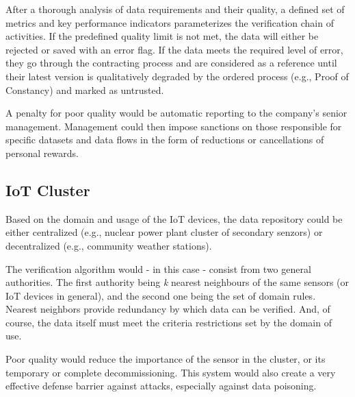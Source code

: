 After a thorough analysis of data requirements and their quality, a defined set of metrics and key performance indicators parameterizes the verification chain of activities.
If the predefined quality limit is not met, the data will either be rejected or saved with an error flag.
If the data meets the required level of error, they go through the contracting process and are considered as a reference until their latest version is qualitatively degraded by the ordered process (e.g., Proof of Constancy) and marked as untrusted.

A penalty for poor quality would be automatic reporting to the company's senior management.
Management could then impose sanctions on those responsible for specific datasets and data flows in the form of reductions or cancellations of personal rewards.

\subsection{IoT Cluster}

Based on the domain and usage of the IoT devices, the data repository could be either centralized (e.g., nuclear power plant cluster of secondary senzors) or decentralized (e.g., community weather stations).

The verification algorithm would - in this case - consist from two general authorities.
The first authority being \textit{k} nearest neighbours of the same sensors (or IoT devices in general), and the second one being the set of domain rules.
Nearest neighbors provide redundancy by which data can be verified.
And, of course, the data itself must meet the criteria restrictions set by the domain of use.

Poor quality would reduce the importance of the sensor in the cluster, or its temporary or complete decommissioning.
This system would also create a very effective defense barrier against attacks, especially against data poisoning.


